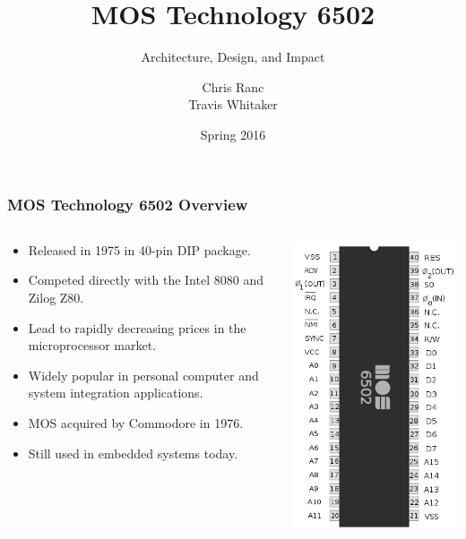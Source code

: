 \documentclass{beamer}
\begin{document}
\title{MOS Technology 6502}
\subtitle{Architecture, Design, and Impact}
\author{Chris Ranc \\ Travis Whitaker}
\date{Spring 2016}
\maketitle

\begin{frame}
\frametitle{MOS Technology 6502 Overview}
\begin{columns}[T]
\begin{column}[T]{0.7\textwidth}
\begin{itemize}
\item Released in 1975 in 40-pin DIP package.
\item Competed directly with the Intel 8080 and Zilog Z80.
\item Lead to rapidly decreasing prices in the microprocessor market.
\item Widely popular in personal computer and system integration applications.
\item MOS acquired by Commodore in 1976.
\item Still used in embedded systems today.
\end{itemize}
\end{column}
\begin{column}[T]{0.3\textwidth}
\includegraphics[scale=0.3]{images/MOS6502.png}
\end{column}
\end{columns}
\end{frame}
\end{document}
